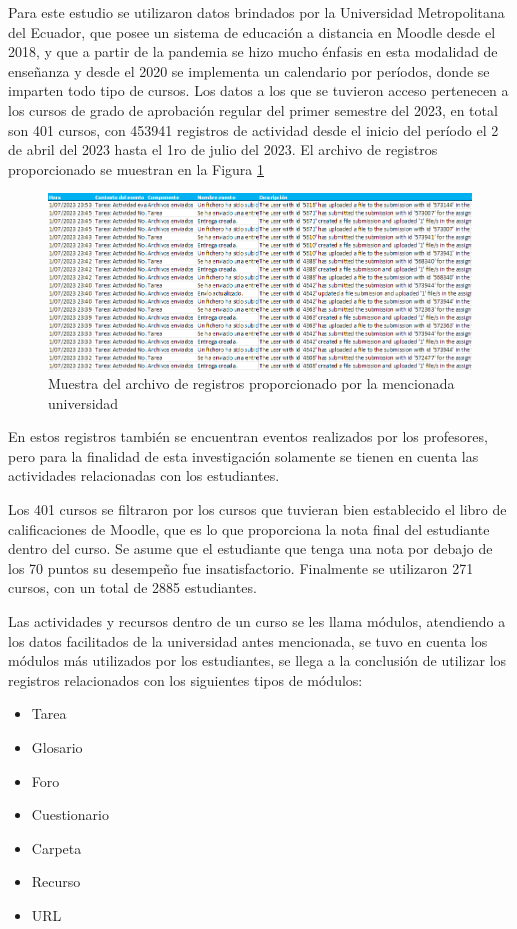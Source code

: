 Para este estudio se utilizaron datos brindados por la Universidad Metropolitana del Ecuador, que posee un sistema de educación a distancia en Moodle desde el 2018, y que a partir de la pandemia se hizo mucho énfasis en esta modalidad de enseñanza y desde el 2020 se implementa un calendario por períodos, donde se imparten todo tipo de cursos. Los datos a los que se tuvieron acceso pertenecen a los cursos de grado de aprobación regular del primer semestre del 2023, en total son 401 cursos, con 453941 registros de actividad desde el inicio del período el 2 de abril del 2023 hasta el 1ro de julio del 2023. El archivo de registros proporcionado se muestran en la Figura \ref{Logs} 
\begin{figure}[htb]
    \centering
    \includegraphics[width = 1 \textwidth]{Graphics/Pasted image 20231227101635.png}
    \caption{Muestra del archivo de registros proporcionado por la mencionada universidad}
    \label{Logs}
\end{figure}

En estos registros también se encuentran eventos realizados por los profesores, pero para la finalidad de esta investigación solamente se tienen en cuenta las actividades relacionadas con los estudiantes.  


Los 401 cursos se filtraron por los cursos que tuvieran bien establecido el libro de calificaciones de Moodle, que es lo que proporciona la nota final del estudiante dentro del curso. Se asume que el estudiante que tenga una nota por debajo de los 70 puntos su desempeño fue insatisfactorio. Finalmente se utilizaron 271 cursos, con un total de 2885 estudiantes.  


Las actividades y recursos dentro de un curso se les llama módulos, atendiendo a los datos facilitados de la universidad antes mencionada, se tuvo en cuenta los módulos más utilizados por los estudiantes, se llega a la conclusión de utilizar los registros relacionados con los siguientes tipos de módulos:   
\begin{itemize}
    \item Tarea
    \item Glosario
    \item Foro
    \item Cuestionario
    \item Carpeta
    \item Recurso
    \item URL
\end{itemize}
    
